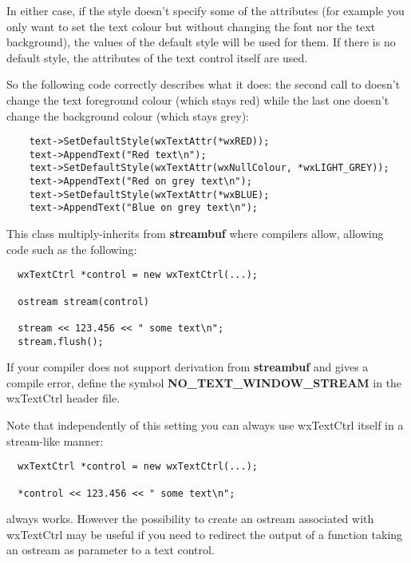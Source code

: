 In either case, if the style doesn't specify some of the attributes (for
example you only want to set the text colour but without changing the font nor
the text background), the values of the default style will be used for them.
If there is no default style, the attributes of the text control itself are
used.

So the following code correctly describes what it does: the second call
to  doesn't change the
text foreground colour (which stays red) while the last one doesn't change the
background colour (which stays grey):

{\small%
\begin{verbatim}
    text->SetDefaultStyle(wxTextAttr(*wxRED));
    text->AppendText("Red text\n");
    text->SetDefaultStyle(wxTextAttr(wxNullColour, *wxLIGHT_GREY));
    text->AppendText("Red on grey text\n");
    text->SetDefaultStyle(wxTextAttr(*wxBLUE);
    text->AppendText("Blue on grey text\n");
\end{verbatim}
}%


This class multiply-inherits from {\bf streambuf} where compilers allow,
allowing code such as the following:

{\small%
\begin{verbatim}
  wxTextCtrl *control = new wxTextCtrl(...);

  ostream stream(control)

  stream << 123.456 << " some text\n";
  stream.flush();
\end{verbatim}
}%

If your compiler does not support derivation from {\bf streambuf} and gives a
compile error, define the symbol {\bf NO\_TEXT\_WINDOW\_STREAM} in the
wxTextCtrl header file.

Note that independently of this setting you can always use wxTextCtrl itself
in a stream-like manner:

{\small%
\begin{verbatim}
  wxTextCtrl *control = new wxTextCtrl(...);

  *control << 123.456 << " some text\n";
\end{verbatim}
}%

always works. However the possibility to create an ostream associated with
wxTextCtrl may be useful if you need to redirect the output of a function
taking an ostream as parameter to a text control.

